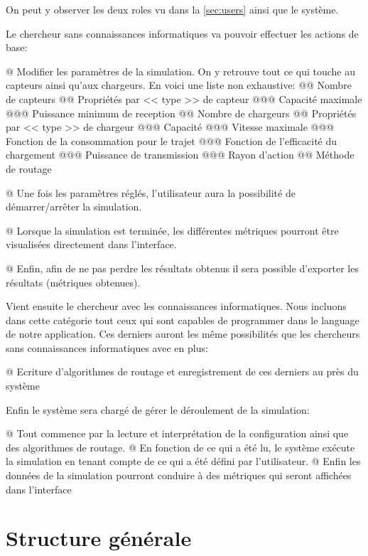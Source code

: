 \documentclass[noposter]{polytech}
\begin{document}
		On peut y observer les deux roles vu dans la \autoref{sec:users} ainsi que le système.
		
		Le chercheur sans connaissances informatiques va pouvoir effectuer les actions de base:
		\begin{easylist}[itemize]
			@ Modifier les paramètres de la simulation.
			On y retrouve tout ce qui touche au capteurs ainsi qu'aux chargeurs.
			En voici une liste non exhaustive:
			@@ Nombre de capteurs
			@@ Propriétés par << type >> de capteur
			@@@ Capacité maximale
			@@@ Puissance minimum de reception
			@@ Nombre de chargeurs
			@@ Propriétés par << type >> de chargeur
			@@@ Capacité
			@@@ Vitesse maximale
			@@@ Fonction de la consommation pour le trajet
			@@@ Fonction de l'efficacité du chargement
			@@@ Puissance de transmission
			@@@ Rayon d'action
			@@ Méthode de routage
			
			@ Une fois les paramètres réglés, l'utilisateur aura la possibilité de démarrer/arrêter la simulation.
			
			@ Lorsque la simulation est terminée, les différentes métriques pourront être visualisées directement dans l'interface.
			
			@ Enfin, afin de ne pas perdre les résultats obtenus il sera possible d'exporter les résultats (métriques obtenues).
		\end{easylist}
		
		Vient ensuite le chercheur avec les connaissances informatiques.
		Nous incluons dans cette catégorie tout ceux qui sont capables de programmer dans le language de notre application.
		Ces derniers auront les même possibilités que les chercheurs sans connaissances informatiques avec en plus:
		\begin{easylist}[itemize]
			@ Ecriture d'algorithmes de routage et enregistrement de ces derniers au près du système
		\end{easylist}
		
		Enfin le système sera chargé de gérer le déroulement de la simulation:
		\begin{easylist}[itemize]
			@ Tout commence par la lecture et interprétation de la configuration ainsi que des algorithmes de routage.
			@ En fonction de ce qui a été lu, le système exécute la simulation en tenant compte de ce qui a été défini par l'utilisateur.
			@ Enfin les données de la simulation pourront conduire à des métriques qui seront affichées dans l'interface
		\end{easylist}

			
	\section{Structure générale} %
	
\end{document}

